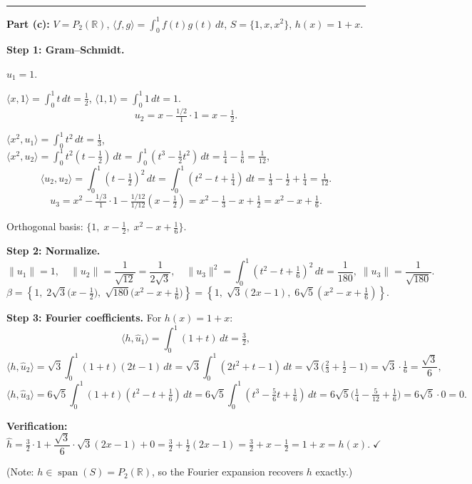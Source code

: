\documentclass{article}
\begin{document}
\begin{mdframed}[linewidth=1pt]
\bigskip
\hrule
\bigskip

\textbf{Part (c):} $V = P_2(\mathbb{R})$, $\langle f, g \rangle = \int_0^1 f(t)g(t)\,dt$, $S = \{1, x, x^2\}$, $h(x) = 1+x$.

\textbf{Step 1: Gram--Schmidt.}

$u_1 = 1$.

$\langle x, 1 \rangle = \int_0^1 t\,dt = \tfrac{1}{2}$, $\langle 1, 1 \rangle = \int_0^1 1\,dt = 1$.
\[
u_2 = x - \tfrac{1/2}{1} \cdot 1 = x - \tfrac{1}{2}.
\]

$\langle x^2, u_1 \rangle = \int_0^1 t^2\,dt = \tfrac{1}{3}$, $\langle x^2, u_2 \rangle = \int_0^1 t^2(t-\tfrac{1}{2})\,dt = \int_0^1 (t^3 - \tfrac{1}{2}t^2)\,dt = \tfrac{1}{4} - \tfrac{1}{6} = \tfrac{1}{12}$,
\[
\langle u_2, u_2 \rangle = \int_0^1 (t-\tfrac{1}{2})^2\,dt = \int_0^1 (t^2 - t + \tfrac{1}{4})\,dt = \tfrac{1}{3} - \tfrac{1}{2} + \tfrac{1}{4} = \tfrac{1}{12}.
\]
\[
u_3 = x^2 - \tfrac{1/3}{1}\cdot 1 - \tfrac{1/12}{1/12}(x - \tfrac{1}{2}) = x^2 - \tfrac{1}{3} - x + \tfrac{1}{2} = x^2 - x + \tfrac{1}{6}.
\]

Orthogonal basis: $\{1,\; x - \tfrac{1}{2},\; x^2 - x + \tfrac{1}{6}\}$.

\textbf{Step 2: Normalize.}
\[
\|u_1\| = 1, \quad \|u_2\| = \frac{1}{\sqrt{12}} = \frac{1}{2\sqrt{3}}, \quad \|u_3\|^2 = \int_0^1 (t^2-t+\tfrac{1}{6})^2\,dt = \frac{1}{180}, \; \|u_3\| = \frac{1}{\sqrt{180}}.
\]
\[
\beta = \left\{1,\; 2\sqrt{3}\bigl(x-\tfrac{1}{2}\bigr),\; \sqrt{180}\bigl(x^2-x+\tfrac{1}{6}\bigr)\right\} = \left\{1,\; \sqrt{3}(2x-1),\; 6\sqrt{5}(x^2-x+\tfrac{1}{6})\right\}.
\]

\textbf{Step 3: Fourier coefficients.} For $h(x) = 1 + x$:
\[
\langle h, \hat{u}_1 \rangle = \int_0^1 (1+t)\,dt = \tfrac{3}{2},
\]
\[
\langle h, \hat{u}_2 \rangle = \sqrt{3}\int_0^1 (1+t)(2t-1)\,dt = \sqrt{3}\int_0^1 (2t^2+t-1)\,dt = \sqrt{3}\bigl(\tfrac{2}{3}+\tfrac{1}{2}-1\bigr) = \sqrt{3}\cdot\tfrac{1}{6} = \frac{\sqrt{3}}{6},
\]
\[
\langle h, \hat{u}_3 \rangle = 6\sqrt{5}\int_0^1 (1+t)(t^2-t+\tfrac{1}{6})\,dt = 6\sqrt{5}\int_0^1 (t^3 - \tfrac{5}{6}t + \tfrac{1}{6})\,dt = 6\sqrt{5}\bigl(\tfrac{1}{4} - \tfrac{5}{12} + \tfrac{1}{6}\bigr) = 6\sqrt{5}\cdot 0 = 0.
\]

\textbf{Verification:}
\[
\hat{h} = \tfrac{3}{2}\cdot 1 + \frac{\sqrt{3}}{6}\cdot\sqrt{3}(2x-1) + 0 = \tfrac{3}{2} + \tfrac{1}{2}(2x-1) = \tfrac{3}{2} + x - \tfrac{1}{2} = 1 + x = h(x). \;\checkmark
\]

(Note: $h \in \operatorname{span}(S) = P_2(\mathbb{R})$, so the Fourier expansion recovers $h$ exactly.)


\end{mdframed}
\end{document}
